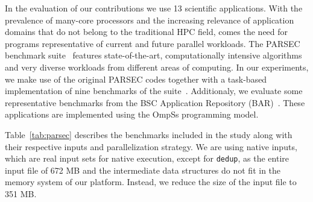 In the evaluation of our contributions we use 13 scientific applications. 
With the prevalence of many-core processors and the increasing relevance of application 
domains that do not belong to the traditional HPC field, comes the need for programs 
representative of current and future parallel workloads. 
The PARSEC benchmark suite~\cite{PARSEC3,Bienia:PhD2011} features state-of-the-art, 
computationally intensive algorithms and very diverse workloads from different areas of computing.
In our experiments, we make use of the original PARSEC codes together with a task-based 
implementation of nine benchmarks of the suite~\cite{Chasapis:TACO2016}. 
Additionaly, we evaluate some representative benchmarks from the BSC Application Repository (BAR)~\cite{BAR}.
These applications are implemented using the OmpSs programming model.

Table~\ref{tab:parsec} describes the benchmarks included in the study along with their respective 
inputs and parallelization strategy. 
We are using native inputs, which are real input sets for native execution, except for \texttt{dedup}, as the entire input file of 672 MB and the intermediate data structures do not fit in the memory system of our platform. 
Instead, we reduce the size of the input file to 351 MB.



